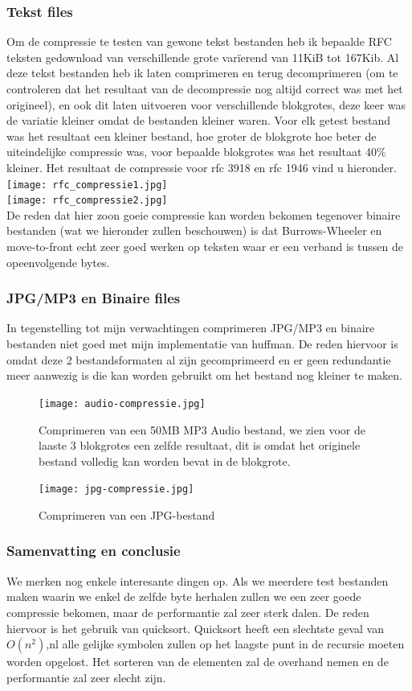 \documentclass[10pt,a4paper]{report}
\begin{document}
\subsubsection*{Tekst files}
Om de compressie te testen van gewone tekst bestanden heb ik bepaalde RFC teksten gedownload van verschillende grote var\"ierend van 11KiB tot 167Kib. Al deze tekst bestanden heb ik laten comprimeren en terug decomprimeren (om te controleren dat het resultaat van de decompressie nog altijd correct was met het origineel), en ook dit laten uitvoeren voor verschillende blokgrotes, deze keer was de variatie kleiner omdat de bestanden kleiner waren. Voor elk getest bestand was het resultaat een kleiner bestand, hoe groter de blokgrote hoe beter de uiteindelijke compressie was, voor bepaalde blokgrotes was het resultaat 40\% kleiner. Het resultaat de compressie voor rfc 3918 en rfc 1946 vind u hieronder.\\

\texttt{[image: rfc\_compressie1.jpg]}\\
\texttt{[image: rfc\_compressie2.jpg]}\\

De reden dat hier zoon goeie compressie kan worden bekomen tegenover binaire bestanden (wat we hieronder zullen beschouwen) is dat Burrows-Wheeler en move-to-front echt zeer goed werken op teksten waar er een verband is tussen de opeenvolgende bytes.
\subsubsection*{JPG/MP3 en Binaire files}
In tegenstelling tot mijn verwachtingen comprimeren JPG/MP3 en binaire bestanden niet goed met mijn implementatie van huffman. De reden hiervoor is omdat deze 2 bestandsformaten al zijn gecomprimeerd en er geen redundantie meer aanwezig is die kan worden gebruikt om het bestand nog kleiner te maken.
\begin{figure}[hbt]
\texttt{[image: audio-compressie.jpg]}
\caption{Comprimeren van een 50MB MP3 Audio bestand, we zien voor de laaste 3 blokgrotes een zelfde resultaat, dit is omdat het originele bestand volledig kan worden bevat in de blokgrote.}
\end{figure}
\begin{figure}[hbt]
\texttt{[image: jpg-compressie.jpg]}\\
\pagebreak
\caption{Comprimeren van een JPG-bestand}
\end{figure}
\subsubsection*{Samenvatting en conclusie}
We merken nog enkele interesante dingen op. Als we meerdere test bestanden maken waarin we enkel de zelfde byte herhalen zullen we een zeer goede compressie bekomen, maar de performantie zal zeer sterk dalen. De reden hiervoor is het gebruik van quicksort. Quicksort heeft een slechtste geval van $O(n^{2})$,nl alle gelijke symbolen zullen op het laagste punt in de recursie moeten worden opgelost. Het sorteren van de elementen zal de overhand nemen en de performantie zal zeer slecht zijn.\\
\end{document}
